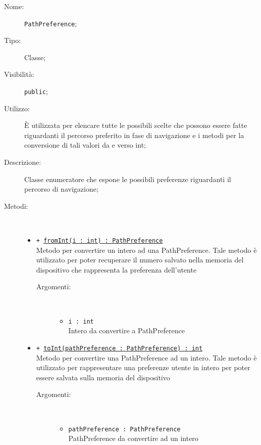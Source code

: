 \documentclass[../DefinizioneDiProdotto.tex]{subfiles}
\begin{document}
\begin{description}
	\item[Nome:] \texttt{PathPreference};
	\item[Tipo:] Classe;
	\item[Visibilità:] \texttt{public};
	\item[Utilizzo:] È utilizzata per elencare tutte le possibili scelte che possono essere fatte riguardanti il percorso preferito in fase di navigazione e i metodi per la conversione di tali valori da e verso int;
	\item[Descrizione:] Classe enumeratore che espone le possibili preferenze riguardanti il percorso di navigazione;
	\item[Metodi:] \
	\begin{itemize}
		\item \texttt{+ \underline{fromInt(i : int) : PathPreference}}\\
		Metodo per convertire un intero ad una PathPreference. Tale metodo è utilizzato per poter recuperare il numero salvato nella memoria del dispositivo che rappresenta la preferenza dell'utente
		\begin{description}
			\item[Argomenti:] \
			\begin{itemize}
				\item \texttt{i : int}\\
				Intero da convertire a PathPreference\end{itemize}
		\end{description}
		\item \texttt{+ \underline{toInt(pathPreference : PathPreference) : int}}\\
		Metodo per convertire una PathPreference ad un intero. Tale metodo è utilizzato per rappresentare una preferenze utente in intero per poter essere salvata sulla memoria del dispositivo
		\begin{description}
			\item[Argomenti:] \
			\begin{itemize}
				\item \texttt{pathPreference : PathPreference}\\
				PathPreference da convertire ad un intero\end{itemize}
		\end{description}
	\end{itemize}
\end{description}
\end{document}
